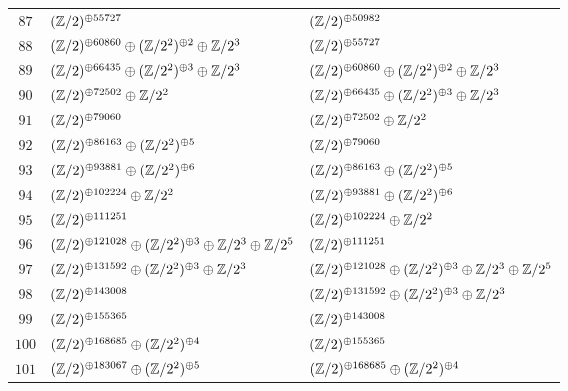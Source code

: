 \begin{supertabular}{|c|p{5.5cm}|p{5.5cm}|}
$87$%
&$(\mathbb{Z}/2)^{\oplus55727}$%
&$(\mathbb{Z}/2)^{\oplus50982}$\\

$88$%
&$(\mathbb{Z}/2)^{\oplus60860}\oplus(\mathbb{Z}/2^{2})^{\oplus2}\oplus\mathbb{Z}/2^{3}$%
&$(\mathbb{Z}/2)^{\oplus55727}$\\

$89$%
&$(\mathbb{Z}/2)^{\oplus66435}\oplus(\mathbb{Z}/2^{2})^{\oplus3}\oplus\mathbb{Z}/2^{3}$%
&$(\mathbb{Z}/2)^{\oplus60860}\oplus(\mathbb{Z}/2^{2})^{\oplus2}\oplus\mathbb{Z}/2^{3}$\\

$90$%
&$(\mathbb{Z}/2)^{\oplus72502}\oplus\mathbb{Z}/2^{2}$%
&$(\mathbb{Z}/2)^{\oplus66435}\oplus(\mathbb{Z}/2^{2})^{\oplus3}\oplus\mathbb{Z}/2^{3}$\\

$91$%
&$(\mathbb{Z}/2)^{\oplus79060}$%
&$(\mathbb{Z}/2)^{\oplus72502}\oplus\mathbb{Z}/2^{2}$\\

$92$%
&$(\mathbb{Z}/2)^{\oplus86163}\oplus(\mathbb{Z}/2^{2})^{\oplus5}$%
&$(\mathbb{Z}/2)^{\oplus79060}$\\

$93$%
&$(\mathbb{Z}/2)^{\oplus93881}\oplus(\mathbb{Z}/2^{2})^{\oplus6}$%
&$(\mathbb{Z}/2)^{\oplus86163}\oplus(\mathbb{Z}/2^{2})^{\oplus5}$\\

$94$%
&$(\mathbb{Z}/2)^{\oplus102224}\oplus\mathbb{Z}/2^{2}$%
&$(\mathbb{Z}/2)^{\oplus93881}\oplus(\mathbb{Z}/2^{2})^{\oplus6}$\\

$95$%
&$(\mathbb{Z}/2)^{\oplus111251}$%
&$(\mathbb{Z}/2)^{\oplus102224}\oplus\mathbb{Z}/2^{2}$\\

$96$%
&$(\mathbb{Z}/2)^{\oplus121028}\oplus(\mathbb{Z}/2^{2})^{\oplus3}\oplus\mathbb{Z}/2^{3}\oplus\mathbb{Z}/2^{5}$%
&$(\mathbb{Z}/2)^{\oplus111251}$\\

$97$%
&$(\mathbb{Z}/2)^{\oplus131592}\oplus(\mathbb{Z}/2^{2})^{\oplus3}\oplus\mathbb{Z}/2^{3}$%
&$(\mathbb{Z}/2)^{\oplus121028}\oplus(\mathbb{Z}/2^{2})^{\oplus3}\oplus\mathbb{Z}/2^{3}\oplus\mathbb{Z}/2^{5}$\\

$98$%
&$(\mathbb{Z}/2)^{\oplus143008}$%
&$(\mathbb{Z}/2)^{\oplus131592}\oplus(\mathbb{Z}/2^{2})^{\oplus3}\oplus\mathbb{Z}/2^{3}$\\

$99$%
&$(\mathbb{Z}/2)^{\oplus155365}$%
&$(\mathbb{Z}/2)^{\oplus143008}$\\

$100$%
&$(\mathbb{Z}/2)^{\oplus168685}\oplus(\mathbb{Z}/2^{2})^{\oplus4}$%
&$(\mathbb{Z}/2)^{\oplus155365}$\\

$101$%
&$(\mathbb{Z}/2)^{\oplus183067}\oplus(\mathbb{Z}/2^{2})^{\oplus5}$%
&$(\mathbb{Z}/2)^{\oplus168685}\oplus(\mathbb{Z}/2^{2})^{\oplus4}$\\


\end{supertabular}
